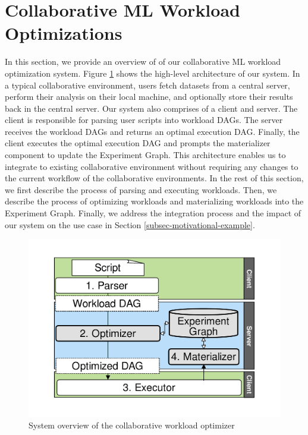 \section{Collaborative ML Workload Optimizations} \label{sec-ml-workloads}
In this section, we provide an overview of of our collaborative ML workload optimization system.
Figure \ref{system-workflow} shows the high-level architecture of our system.
In a typical collaborative environment, users fetch datasets from a central server, perform their analysis on their local machine, and optionally store their results back in the central server.
Our system also comprises of a client and server.
The client is responsible for parsing user scripts into workload DAGs.
The server receives the workload DAGs and returns an optimal execution DAG.
Finally, the client executes the optimal execution DAG and prompts the materializer component to update the Experiment Graph.
This architecture enables us to integrate to existing collaborative environment without requiring any changes to the current workflow of the collaborative environments.
In the rest of this section, we first describe the process of parsing and executing workloads.
Then, we describe the process of optimizing workloads and materializing workloads into the Experiment Graph.
Finally, we address the integration process and the impact of our system on the use case in Section \ref{subsec-motivational-example}.

\begin{figure}
\centering
\includegraphics[width=0.7\columnwidth]{../images/system-workflow}
\caption{System overview of the collaborative workload optimizer}
\label{system-workflow}
\end{figure}

